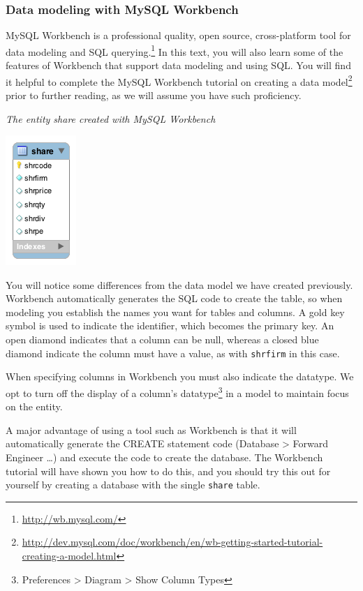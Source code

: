 \documentclass[
]{article}
\begin{document}
\hypertarget{data-modeling-with-mysql-workbench}{%
\subsubsection*{Data modeling with MySQL Workbench}\label{data-modeling-with-mysql-workbench}}

MySQL Workbench is a professional quality, open source, cross-platform tool for data modeling and SQL querying.\footnote{\url{http://wb.mysql.com/}} In this text, you will also learn some of the features of Workbench that support data modeling and using SQL. You will find it helpful to complete the MySQL Workbench tutorial on creating a data model\footnote{\url{http://dev.mysql.com/doc/workbench/en/wb-getting-started-tutorial-creating-a-model.html}} prior to further reading, as we will assume you have such proficiency.

\emph{The entity share created with MySQL Workbench}

\includegraphics{Figures/Chapter 3/share-wb.png}

You will notice some differences from the data model we have created previously. Workbench automatically generates the SQL code to create the table, so when modeling you establish the names you want for tables and columns. A gold key symbol is used to indicate the identifier, which becomes the primary key. An open diamond indicates that a column can be null, whereas a closed blue diamond indicate the column must have a value, as with \texttt{shrfirm} in this case.

When specifying columns in Workbench you must also indicate the datatype. We opt to turn off the display of a column's datatype\footnote{Preferences \textgreater{} Diagram \textgreater{} Show Column Types} in a model to maintain focus on the entity.

A major advantage of using a tool such as Workbench is that it will automatically generate the CREATE statement code (Database \textgreater{} Forward Engineer \ldots) and execute the code to create the database. The Workbench tutorial will have shown you how to do this, and you should try this out for yourself by creating a database with the single \texttt{share} table.
\end{document}

